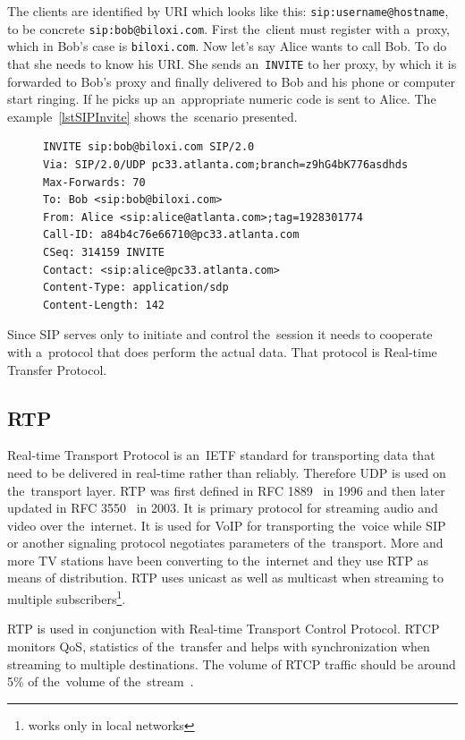 The clients are identified by URI which looks like this: \verb|sip:username@hostname|, to be concrete \verb|sip:bob@biloxi.com|. First the~client must register with a~proxy, which in Bob's case is \verb|biloxi.com|. Now let's say Alice wants to call Bob. To do that she needs to know his URI. She sends an~\verb|INVITE| to her proxy, by which it is forwarded to Bob's proxy and finally delivered to Bob and his phone or computer start ringing. If he picks up an~appropriate numeric code is sent to Alice. The example~\ref{lstSIPInvite} shows the~scenario presented.    

\begin{figure}[h]
\begin{lstlisting}
INVITE sip:bob@biloxi.com SIP/2.0
Via: SIP/2.0/UDP pc33.atlanta.com;branch=z9hG4bK776asdhds
Max-Forwards: 70
To: Bob <sip:bob@biloxi.com>
From: Alice <sip:alice@atlanta.com>;tag=1928301774
Call-ID: a84b4c76e66710@pc33.atlanta.com
CSeq: 314159 INVITE
Contact: <sip:alice@pc33.atlanta.com>
Content-Type: application/sdp
Content-Length: 142
\end{lstlisting}
\end{figure}

Since SIP serves only to initiate and control the~session it needs to cooperate with a~protocol that does perform the actual data. That protocol is Real-time Transfer Protocol.  

\subsection*{RTP}
Real-time Transport Protocol is an~IETF standard for transporting data that need to be delivered in real-time rather than reliably. Therefore UDP is used on the~transport layer. RTP was first defined in RFC 1889~\cite{rtpOldRFC} in 1996 and then later updated in RFC 3550~\cite{rtpRFC} in 2003. It is primary protocol for streaming audio and video over the~internet. It is used for VoIP for transporting the~voice while SIP or another signaling protocol negotiates parameters of the~transport. More and more TV stations have been converting to the~internet and they use RTP as means of distribution. RTP uses unicast as well as multicast when streaming to multiple subscribers\footnote{works only in local networks}. 

RTP is used in conjunction with Real-time Transport Control Protocol. RTCP monitors QoS, statistics of the~transfer and helps with synchronization when streaming to multiple destinations. The volume of RTCP traffic should be around 5\% of the~volume of the~stream~\cite{rtpBook}.  

